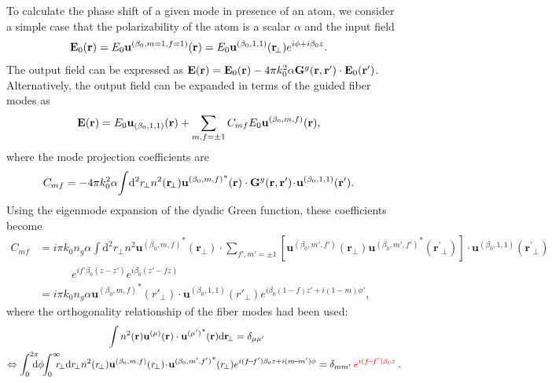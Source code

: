 \documentclass[preprint,aps,pra,onecolumn]{revtex4-1} %
\begin{document}
To calculate the phase shift of a given mode in presence of an atom, we consider a simple case that the polarizability of the atom is a scalar $\alpha$ and the input field 
\begin{align}
\mathbf{E}_0(\mathbf{r}) &= E_0 \mathbf{u}^{(\beta_0,m=1,f=1)} (\mathbf{r}) = E_0 \mathbf{u}^{(\beta_0,1,1)} (\mathbf{r}\!_\perp)e^{i\phi+i\beta_0 z}. 
\end{align}
The output field can be expressed as
$\mathbf{E}(\mathbf{r})  = \mathbf{E}_0(\mathbf{r}) -4\pi k_0^2 \alpha \mathbf{G}^g(\mathbf{r},\mathbf{r}')\cdot\mathbf{E}_0(\mathbf{r}')$.
Alternatively, the output field can be expanded in terms of the guided fiber modes as
\begin{align}
\mathbf{E}(\mathbf{r}) &= E_0\mathbf{u}_{(\beta_0,1,1)} (\mathbf{r}) + \sum_{m,f=\pm 1} C_{mf} E_0 \mathbf{u}^{(\beta_0,m,f)}(\mathbf{r}),  
\end{align}
where the mode projection coefficients are
\begin{align}
C_{mf} &= -4\pi k_0^2 \alpha \!\int\! \mathrm{d}^2r\!_\perp n^2(\mathbf{r}\!_\perp){\mathbf{u}^{(\beta_0,m,f)}}^*(\mathbf{r})\cdot \mathbf{G}^g(\mathbf{r},\mathbf{r}') \!\cdot\! \mathbf{u}^{(\beta_0,1,1)}(\mathbf{r}^\prime).
\end{align}
Using the eigenmode expansion of the dyadic Green function, these coefficients become
\begin{align}
C_{mf} &= i\pi k_0 n_g\alpha \!\int\! \mathrm{d}^2r\!_\perp n^2 {\mathbf{u}^{(\beta_0,m,f)}}^*(\mathbf{r}\!_\perp)\cdot\!\!\!\!\!\! \sum_{f',m'=\pm 1}\!\!\!\! \left[\mathbf{u}^{(\beta_0,m',f')}(\mathbf{r}\!_\perp){\mathbf{u}^{(\beta_0,m',f')}}^*(\mathbf{r}^\prime\!_\perp) \right]\!\cdot\! \mathbf{u}^{(\beta_0,1,1)}(\mathbf{r}^\prime\!_\perp)\nonumber\\
&\quad\quad\quad e^{if'\beta_0(z-z')} e^{i\beta_0(z'-fz)}\\
&= i\pi k_0 n_g\alpha  {\mathbf{u}^{(\beta_0,m,f)}}^*(r'_{\!\perp})\cdot \mathbf{u}^{(\beta_0,1,1)}(r'_{\!\perp})e^{i\beta_0 (1-f)z'+i(1-m)\phi'},\label{eq:Cmf}
\end{align}
where the orthogonality relationship of the fiber modes had been used:
\begin{align}
\int n^2(\br)  \mathbf{u}^{(\mu)}(\br) \cdot {\mathbf{u}^{(\mu')}}^*(\br)\mathrm{d} \br\!_\perp &=\delta_{\mu\mu'}\\
\Leftrightarrow \int_0^{2\pi}\!\!\!\!\! \mathrm{d}\phi\!\! \int_0^\infty\!\!\!\! r\!_\perp \mathrm{d}r\!_\perp  n^2(r\!_\perp) \mathbf{u}^{(\beta_0,m,f)}(r\!_\perp )\!\cdot\!{\mathbf{u}^{(\beta_0,m',f')}}^*(r\!_\perp )& e^{i(f\!-\!f')\beta_0 z+i(m\! -\! m')\phi}  =\delta_{mm'}\mathbin{\color{red}e^{i(f\!-\!f')\beta_0 z}} \label{eq:orthutrans}.
\end{align}
\end{document}
